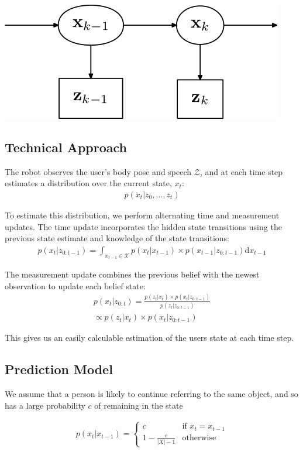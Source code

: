 \documentclass[a4paper, 11pt]{article} %
\begin{document}
\includegraphics[scale=0.7]{images/bayes_filter}

\subsection{Technical Approach}
The robot observes the user's body pose and speech $\mathcal{Z}$, and at each time step estimates a distribution over the current state, $x_t$:
\begin{align}
p(x_t | z_0, \dots, z_t)
\end{align}

To estimate this distribution, we perform alternating time and measurement updates. The time update incorporates the hidden state transitions using the previous state estimate and knowledge of the state transitions:
\begin{align}
p(x_t | z_{0:t-1}) = \int_{x_{t-1} \in \mathcal{X}} p(x_t|x_{t-1})\times p(x_{t-1} | z_{0:t-1}) \text{d}x_{t-1}
\end{align}

The measurement update combines the previous belief with the newest observation to update each belief state: 
\begin{align}
p(x_t |z_{0:t}) = \frac{p(z_t | x_t) \times p(x_t | z_{0:t-1})}{p(z_t | z_{0:t-1})} \\\propto p(z_t | x_t) \times p(x_t | z_{0:t-1})
\end{align}

This gives us an easily calculable estimation of the users state at each time step.
\subsection{Prediction Model}
We assume that a person is likely to continue referring to the same
object, and so has a large probability $c$ of remaining in the state

\begin{align}
p(x_t | x_{t-1}) = \left\{  \begin{array}{ll}
c&\mbox{if } x_t = x_{t-1}\\
1-\frac{c}{|X|-1}&\mbox{otherwise}
\end{array}\right.
\end{align}
\end{document}
